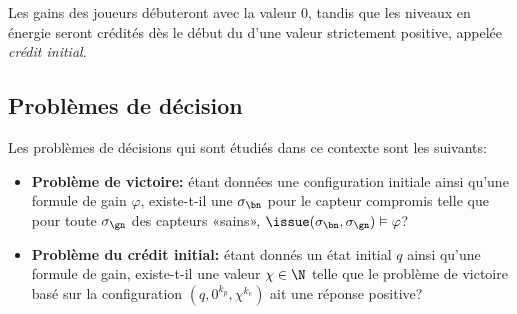 Les gains des joueurs débuteront avec la valeur $0$, tandis que les niveaux en énergie seront crédités dès le début du  d'une valeur strictement positive, appelée \emph{crédit initial}.

\subsection{Problèmes de décision}

Les problèmes de décisions qui sont étudiés dans ce contexte sont les suivants:

\begin{itemize}
    \item \textbf{Problème de victoire:} étant données une configuration initiale ainsi qu'une formule de gain $\varphi$, existe-t-il une  $\sigma_\bn$ pour le capteur compromis telle que pour toute  $\sigma_\gn$ des capteurs «sains», $\issue(\sigma_\bn,\sigma_\gn) \vDash \varphi$?
    \item \textbf{Problème du crédit initial:} étant donnés un état initial $q$ ainsi qu'une formule de gain, existe-t-il une valeur $\chi \in \N$ telle que le problème de victoire basé sur la configuration $(q,0^{k_p},\chi^{k_e})$ ait une réponse positive?
\end{itemize}
